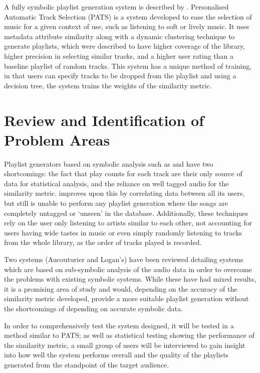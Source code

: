 A fully symbolic playlist generation system is described by \citet{Pauws2002}. Personalised Automatic Track Selection (PATS) is a system developed to ease the selection of music for a given context of use, such as listening to soft or lively music. It uses metadata attribute similarity along with a dynamic clustering technique to generate playlists, which were described to have higher coverage of the library, higher precision in selecting similar tracks, and a higher user rating than a baseline playlist of random tracks. This system has a unique method of training, in that users can specify tracks to be dropped from the playlist and using a decision tree, the system trains the weights of the similarity metric. 
\section{Review and Identification of Problem Areas}
Playlist generators based on symbolic analysis such as  and  have two shortcomings: the fact that play counts for each track are their only source of data for statistical analysis, and the reliance on well tagged audio for the similarity metric.  improves upon this by correlating data between all its users, but still is unable to perform any playlist generation where the songs are completely untagged or `unseen' in the database. Additionally, these techniques rely on the user only listening to artists similar to each other, not accounting for users having wide tastes in music or even simply randomly listening to tracks from the whole library, as the order of tracks played is recorded.

Two systems (Aucouturier and Logan's) have been reviewed detailing systems which are based on sub-symbolic analysis of the audio data in order to overcome the problems with existing symbolic systems. While these have had mixed results, it is a promising area of study and would, depending on the accuracy of the similarity metric developed, provide a more suitable playlist generation without the shortcomings of depending on accurate symbolic data.

In order to comprehensively test the system designed, it will be tested in a method similar to PATS; as well as statistical testing showing the performance of the similarity metric, a small group of users will be interviewed to gain insight into how well the system performs overall and the quality of the playlists generated from the standpoint of the target audience.
